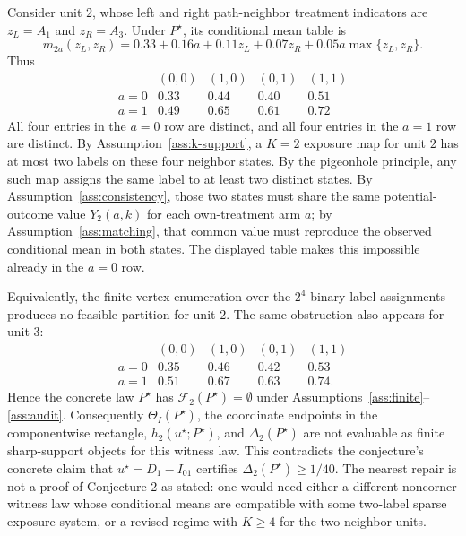 Consider unit \(2\), whose left and right path-neighbor treatment indicators are \(z_L=A_1\) and \(z_R=A_3\).  Under \(P^\star\), its conditional mean table is
\[
m_{2a}(z_L,z_R)
=0.33+0.16a+0.11z_L+0.07z_R+0.05a\max\{z_L,z_R\}.
\]
Thus
\[
\begin{array}{c|cccc}
& (0,0)&(1,0)&(0,1)&(1,1)\\ \hline
a=0&0.33&0.44&0.40&0.51\\
a=1&0.49&0.65&0.61&0.72
\end{array}
\]
All four entries in the \(a=0\) row are distinct, and all four entries in the \(a=1\) row are distinct.  By Assumption~\ref{ass:k-support}, a \(K=2\) exposure map for unit \(2\) has at most two labels on these four neighbor states.  By the pigeonhole principle, any such map assigns the same label to at least two distinct states.  By Assumption~\ref{ass:consistency}, those two states must share the same potential-outcome value \(Y_2(a,k)\) for each own-treatment arm \(a\); by Assumption~\ref{ass:matching}, that common value must reproduce the observed conditional mean in both states.  The displayed table makes this impossible already in the \(a=0\) row.

Equivalently, the finite vertex enumeration over the \(2^4\) binary label assignments produces no feasible partition for unit \(2\).  The same obstruction also appears for unit \(3\):
\[
\begin{array}{c|cccc}
& (0,0)&(1,0)&(0,1)&(1,1)\\ \hline
a=0&0.35&0.46&0.42&0.53\\
a=1&0.51&0.67&0.63&0.74 .
\end{array}
\]
Hence the concrete law \(P^\star\) has \(\mathcal F_2(P^\star)=\emptyset\) under Assumptions~\ref{ass:finite}--\ref{ass:audit}.  Consequently \(\Theta_I(P^\star)\), the coordinate endpoints in the componentwise rectangle, \(h_2(u^\star;P^\star)\), and \(\Delta_2(P^\star)\) are not evaluable as finite sharp-support objects for this witness law.  This contradicts the conjecture's concrete claim that \(u^\star=D_1-I_{01}\) certifies \(\Delta_2(P^\star)\ge1/40\).  The nearest repair is not a proof of Conjecture 2 as stated: one would need either a different noncorner witness law whose conditional means are compatible with some two-label sparse exposure system, or a revised regime with \(K\ge4\) for the two-neighbor units.
